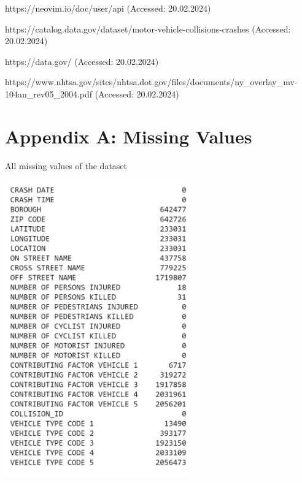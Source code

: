 \documentclass[runningheads]{llncs}
\begin{document}
\newpage
\begin{thebibliography}{8}

https://neovim.io/doc/user/api (Accessed: 20.02.2024)

https://catalog.data.gov/dataset/motor-vehicle-collisions-crashes \newline (Accessed: 20.02.2024)

https://data.gov/ (Accessed: 20.02.2024)


https://www.nhtsa.gov/sites/nhtsa.dot.gov/files/documents/ny\_overlay\_mv-104an\_rev05\_2004.pdf (Accessed: 20.02.2024)

\end{thebibliography}

\begin{table}
    \section{Appendix A: Missing Values}
\center
\caption{All missing values of the dataset}
\includegraphics[width=8cm]{datavalues.png}
\end{table}
\end{document}
